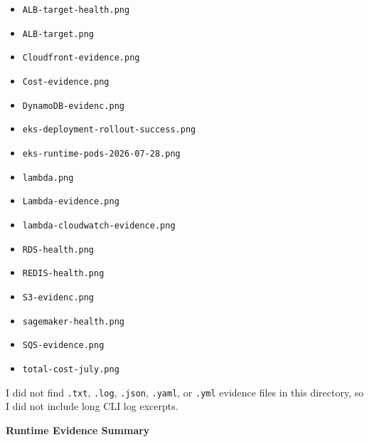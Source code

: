 \begin{itemize}
\tightlist
\item
  \texttt{ALB-\allowbreak{}target-\allowbreak{}health.\allowbreak{}png}
\item
  \texttt{ALB-\allowbreak{}target.\allowbreak{}png}
\item
  \texttt{Cloudfront-\allowbreak{}evidence.\allowbreak{}png}
\item
  \texttt{Cost-\allowbreak{}evidence.\allowbreak{}png}
\item
  \texttt{DynamoDB-\allowbreak{}evidenc.\allowbreak{}png}
\item
  \texttt{eks-\allowbreak{}deployment-\allowbreak{}rollout-\allowbreak{}success.\allowbreak{}png}
\item
  \texttt{eks-\allowbreak{}runtime-\allowbreak{}pods-\allowbreak{}2026-\allowbreak{}07-\allowbreak{}28.\allowbreak{}png}
\item
  \texttt{lambda.\allowbreak{}png}
\item
  \texttt{Lambda-\allowbreak{}evidence.\allowbreak{}png}
\item
  \texttt{lambda-\allowbreak{}cloudwatch-\allowbreak{}evidence.\allowbreak{}png}
\item
  \texttt{RDS-\allowbreak{}health.\allowbreak{}png}
\item
  \texttt{REDIS-\allowbreak{}health.\allowbreak{}png}
\item
  \texttt{S3-\allowbreak{}evidenc.\allowbreak{}png}
\item
  \texttt{sagemaker-\allowbreak{}health.\allowbreak{}png}
\item
  \texttt{SQS-\allowbreak{}evidence.\allowbreak{}png}
\item
  \texttt{total-\allowbreak{}cost-\allowbreak{}july.\allowbreak{}png}
\end{itemize}

I did not find \texttt{.\allowbreak{}txt}, \texttt{.\allowbreak{}log}, \texttt{.\allowbreak{}json},
\texttt{.\allowbreak{}yaml}, or \texttt{.\allowbreak{}yml} evidence files in this directory, so I
did not include long CLI log excerpts.

\vspace{0.5em}\noindent\textbf{Runtime Evidence Summary}\par

